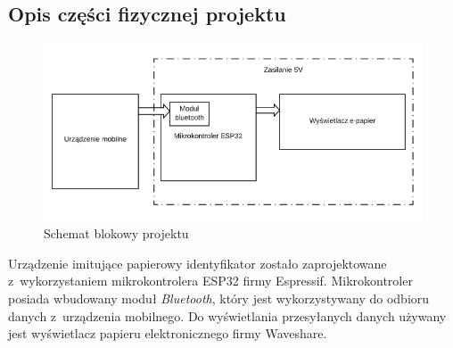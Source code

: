 \documentclass[a4paper,12pt, twoside]{article}
\begin{document}
        \subsection{Opis części fizycznej projektu}
        \begin{figure}[H]
    	        \centering
    			\includegraphics[width=12cm]{images/rys_7schemat_blokowy.png}
    			\caption{Schemat blokowy projektu}
                \label{fig:block}
    	\end{figure}
        Urządzenie imitujące papierowy identyfikator zostało zaprojektowane z~wykorzystaniem mikrokontrolera ESP32 firmy Espressif. Mikrokontroler posiada wbudowany moduł \textit{Bluetooth}, który jest wykorzystywany do odbioru danych z~urządzenia mobilnego. Do wyświetlania przesyłanych danych używany jest wyświetlacz papieru elektronicznego firmy Waveshare.
        
\end{document}
